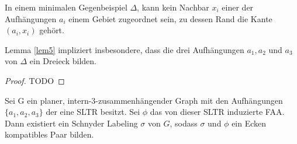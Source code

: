 \begin{lemma}\label{lem5}
In einem minimalen Gegenbeispiel $\Delta$, kann kein Nachbar $x_i$ einer der Aufhängungen $a_i$ einem Gebiet zugeordnet sein, zu dessen Rand die Kante $(a_i,x_i)$ gehört.
\end{lemma}

\begin{remark}
Lemma \ref{lem5} impliziert insbesondere, dass die drei Aufhängungen $a_1,a_2$ und $a_3$ von $\Delta$ ein Dreieck bilden.
\end{remark}

\begin{proof}
TODO
\end{proof}

\begin{lemma}\label{lem6}
Sei G ein planer, intern-3-zusammenhängender Graph mit den Aufhängungen $\{a_1,a_2,a_3\}$ der eine SLTR besitzt. Sei $\phi$ das von dieser SLTR induzierte FAA. Dann existiert ein Schnyder Labeling $\sigma$ von $G$, sodass $\sigma$ und $\phi$ ein Ecken kompatibles Paar bilden.
\end{lemma}

